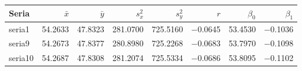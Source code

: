 \begin{tabular}{lrrrrrrr}
\toprule
Seria & $\bar{x}$ & $\bar{y}$ & $s_x^2$ & $s_y^2$ & $r$ & $\beta_0$ & $\beta_1$ \\
\midrule
seria1 & \num{54.2633} & \num{47.8323} & \num{281.0700} & \num{725.5160} & \num{-0.0645} & \num{53.4530} & \num{-0.1036} \\
seria9 & \num{54.2673} & \num{47.8377} & \num{280.8980} & \num{725.2268} & \num{-0.0683} & \num{53.7970} & \num{-0.1098} \\
seria10 & \num{54.2687} & \num{47.8308} & \num{281.2074} & \num{725.5334} & \num{-0.0686} & \num{53.8095} & \num{-0.1102} \\
\bottomrule
\end{tabular}
